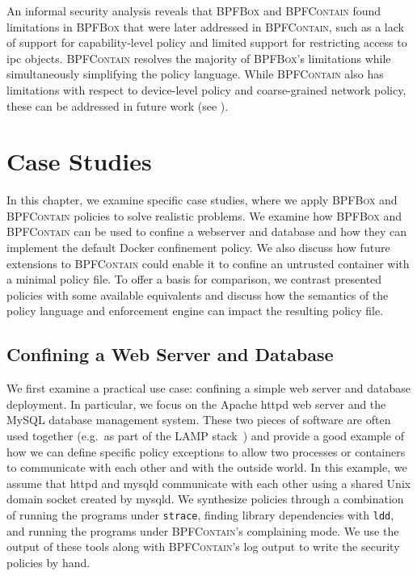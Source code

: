 \documentclass[
  fontsize=12pt,
  titlepage=firstiscover,
  paper=letter,
oneside,
  cleardoublepage=plain,
  parskip=half-,
  DIV=10,
  parindent,
  appendixprefix,
  chapterprefix,
  listof=totoc,
]{scrbook}
\newcommand{\bpfbox}{\textsc{BPFBox}}
\newcommand{\bpfcontain}{\textsc{BPFContain}}
\begin{document}
An informal security analysis reveals that \bpfbox{} and \bpfcontain{} found limitations
in \bpfbox{} that were later addressed in \bpfcontain{}, such as a lack of support for
capability-level policy and limited support for restricting access to \gls{ipc} objects.
\bpfcontain{} resolves the majority of \bpfbox{}'s limitations while simultaneously
simplifying the policy language. While \bpfcontain{} also has limitations with respect to
device-level policy and coarse-grained network policy, these can be addressed in future
work (see ).


 
\chapter{Case Studies}\label{c:case-studies}
In this chapter, we examine specific case studies, where we apply \bpfbox{} and
\bpfcontain{} policies to solve realistic problems. We examine how \bpfbox{} and
\bpfcontain{} can be used to confine a webserver and database and how they can implement
the default Docker confinement policy.  We also discuss how future extensions to
\bpfcontain{} could enable it to confine an untrusted container with a minimal policy file.
To offer a basis for comparison, we contrast presented policies with some available
equivalents and discuss how the semantics of the policy language and enforcement engine
can impact the resulting policy file.



\section{Confining a Web Server and Database}

We first examine a practical use case: confining a simple web server and database
deployment. In particular, we focus on the Apache httpd web server and the MySQL database
management system. These two pieces of software are often used together (e.g.\ as part of
the LAMP stack~\cite{lamp}) and provide a good example of how we can define specific
policy exceptions to allow two processes or containers to communicate with each other and
with the outside world. In this example, we assume that httpd and mysqld communicate with
each other using a shared Unix domain socket created by mysqld. We synthesize policies
through a combination of running the programs under \texttt{strace}, finding library
dependencies with \texttt{ldd}, and running the programs under \bpfcontain{}'s complaining
mode. We use the output of these tools along with \bpfcontain{}'s log output to write
the security policies by hand.
\end{document}
